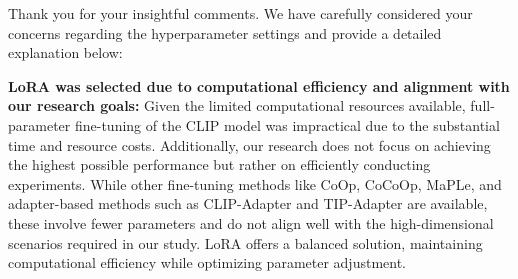 \documentclass[a4paper,twoside,11pt,dvipsnames]{reviewresponse}
\begin{document}


Thank you for your insightful comments. We have carefully considered your concerns regarding the hyperparameter settings and provide a detailed explanation below:

\textbf{LoRA was selected due to computational efficiency and alignment with our research goals:}
Given the limited computational resources available, full-parameter fine-tuning of the CLIP model was impractical due to the substantial time and resource costs. Additionally, our research does not focus on achieving the highest possible performance but rather on efficiently conducting experiments. While other fine-tuning methods like CoOp\cite{zhou2022learning}, CoCoOp\cite{zhou2022conditional}, MaPLe, and adapter-based methods such as CLIP-Adapter\cite{gao2024clip} and TIP-Adapter\cite{zhang2021tip} are available, these involve fewer parameters and do not align well with the high-dimensional scenarios required in our study. LoRA offers a balanced solution, maintaining computational efficiency while optimizing parameter adjustment.
\end{document}
